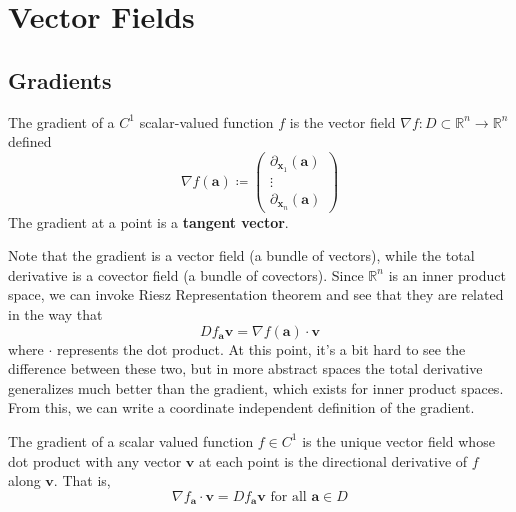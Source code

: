 \section{Vector Fields} 

\subsection{Gradients}

  \begin{definition}[Gradient]
  The gradient of a $C^1$ scalar-valued function $f$ is the vector field $\nabla f: D \subset \mathbb{R}^n \longrightarrow \mathbb{R}^n$ defined 
  \[\nabla f(\mathbf{a}) \coloneqq \begin{pmatrix} \partial_{\mathbf{x}_1} (\mathbf{a}) \\ \vdots \\ \partial_{\mathbf{x}_n} (\mathbf{a}) \end{pmatrix} \]
  The gradient at a point is a \textbf{tangent vector}. 
  \end{definition}

  Note that the gradient is a vector field (a bundle of vectors), while the total derivative is a covector field (a bundle of covectors). Since $\mathbb{R}^n$ is an inner product space, we can invoke Riesz Representation theorem and see that they are related in the way that 
  \[D f_\mathbf{a} \mathbf{v} = \nabla f (\mathbf{a}) \cdot \mathbf{v}\]
  where $\cdot$ represents the dot product. At this point, it's a bit hard to see the difference between these two, but in more abstract spaces the total derivative generalizes much better than the gradient, which exists for inner product spaces. From this, we can write a coordinate independent definition of the gradient. 

  \begin{definition}[Gradient]
  The gradient of a scalar valued function $f \in C^1$ is the unique vector field whose dot product with any vector $\mathbf{v}$ at each point is the directional derivative of $f$ along $\mathbf{v}$. That is, 
  \[\nabla f_\mathbf{a} \cdot \mathbf{v} = D f_\mathbf{a} \mathbf{v} \text{ for all } \mathbf{a} \in D\]
  \end{definition}

